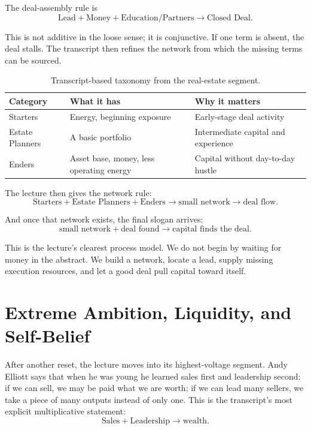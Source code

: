 The deal-assembly rule is
\begin{equation}
\text{Lead}+\text{Money}+\text{Education/Partners} \to \text{Closed Deal}.
\end{equation}

This is not additive in the loose sense; it is conjunctive. If one term is absent, the deal stalls. The transcript then refines the network from which the missing terms can be sourced.

\begin{table}[h]
\centering
\begin{tabular}{|l|l|l|}
\hline
Category & What it has & Why it matters \\
\hline
Starters & Energy, beginning exposure & Early-stage deal activity \\
\hline
Estate Planners & A basic portfolio & Intermediate capital and experience \\
\hline
Enders & Asset base, money, less operating energy & Capital without day-to-day hustle \\
\hline
\end{tabular}
\caption{Transcript-based taxonomy from the real-estate segment.}
\end{table}

The lecture then gives the network rule:
\begin{equation}
\text{Starters}+\text{Estate Planners}+\text{Enders}
\to
\text{small network}
\to
\text{deal flow}.
\end{equation}

And once that network exists, the final slogan arrives:
\begin{equation}
\text{small network}+\text{deal found} \to \text{capital finds the deal}.
\end{equation}

This is the lecture's clearest process model. We do not begin by waiting for money in the abstract. We build a network, locate a lead, supply missing execution resources, and let a good deal pull capital toward itself.

\section{Extreme Ambition, Liquidity, and Self-Belief}

After another reset, the lecture moves into its highest-voltage segment. Andy Elliott says that when he was young he learned sales first and leadership second: if we can sell, we may be paid what we are worth; if we can lead many sellers, we take a piece of many outputs instead of only one. This is the transcript's most explicit multiplicative statement:
\begin{equation}
\text{Sales}+\text{Leadership} \to \text{wealth}.
\end{equation}

